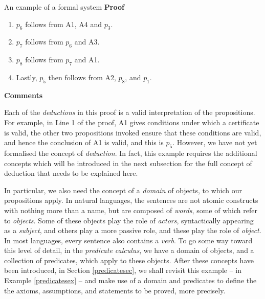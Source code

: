 \begin{example}{An example of a formal system}
{\bf Proof}
\begin{enumerate}[1.]
\item $p_6$ follows from A1, A4 and $p_3$. 

\item $p_7$ follows from $p_6$ and A3. 

\item $p_8$ follows from $p_7$ and A1. 

\item Lastly, $p_5$ then follows from A2, $p_8$, and $p_1$.
\end{enumerate}

{\bf Comments}

Each of the {\em deductions} in this proof is a valid interpretation of the propositions. For example,
in Line 1 of the proof,
A1 gives conditions under which a certificate is valid, the other two propositions invoked ensure
that these conditions are valid, and hence the conclusion of A1 is valid, and this is $p_5$. However,
we have not yet formalised the concept of {\em deduction}. In fact, this example requires the additional
concepts which will be introduced in the next subsection for the full concept of deduction
that needs to be explained here.

In particular, we also need the concept of a {\em domain} of objects, to which our propositions
apply. In natural languages, the sentences are not atomic constructs with nothing more than a name, but
are composed of {\em words}, some of which refer to {\em objects}. Some of these objects play the role of
{\em actors}, syntactically appearing as a {\em subject}, and others play a more passive role, and these
play the role of {\em object}. In most languages, every sentence also contains a {\em verb}. To
go some way toward this level of detail, in the {\em predicate calculus}, we have a domain
of objects, and a collection of predicates, which apply to these objects. After these concepts
have been introduced, in Section \ref{predicatesec}, we shall revisit this example 
-- in Example \ref{predicatesex} -- and make use of a domain
and predicates to define the the axioms, assumptions, and statements to be proved, more precisely.

\end{example}

